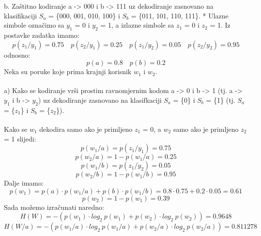 \documentclass[12pt]{article}
\begin{document}
\begin{enumerate}
b. Zaštitno kodiranje a -> 000 i b -> 111 uz dekodiranje zasnovano na klasifikaciji $S_a$ = \{000, 001, 010, 100\} i $S_b$ = \{011, 101, 110, 111\}.
\newpage
* Ulazne simbole označimo sa $y_1$ = 0 i $y_2$ = 1, a izlazne simbole sa $z_1$ = 0 i
$z_2$ = 1. Iz postavke zadatka imamo:
\begin{equation*}
    p(z_1/y_1) = 0.75 \quad p(z_2/y_1) = 0.25 \quad p(z_1/y_2) = 0.05 \quad p(z_2/y_2) = 0.95
\end{equation*}
odnosno:
\begin{equation*}
    p(a) = 0.8 \quad p(b) = 0.2
\end{equation*}
Neka su poruke koje prima krajnji korisnik $w_1$ i $w_2$. \\
\\
a) Kako se kodiranje vrši prostim ravnomjernim kodom a -> 0 i b -> 1 (tj. a -> $y_1$ i b -> $y_2$) uz dekodiranje zasnovano na klasifkaciji $S_a$ = \{0\} i
$S_b$ = \{1\} (tj. $S_a$ = \{$z_1$\} i $S_b$ = \{$z_2$\}).\\
\\
Kako se $w_1$ dekodira samo ako je primljeno $z_1$ = 0, a $w_2$ samo ako je
primljeno $z_2$ = 1 slijedi:
\begin{equation*}
    p(w_1/a) = p(z_1/y_1) = 0.75
\end{equation*}
\begin{equation*}
    p(w_2/a) = 1 - p(w_1/a) = 0.25
\end{equation*}
\begin{equation*}
    p(w_1/b) = p(z_1/y_2) = 0.05
\end{equation*}
\begin{equation*}
    p(w_2/b) = 1 - p(w_1/b) = 0.95
\end{equation*}
Dalje imamo:
\begin{equation*}
    p(w_1) = p(a) \cdot p(w_1/a) + p(b) \cdot p(w_1/b) = 0.8 \cdot 0.75 + 0.2 \cdot  0.05 = 0.61
\end{equation*}
\begin{equation*}
    p(w_2) = 1 - p(w_1) =  0.39
\end{equation*}
Sada možemo izračunati naredno: \\
\begin{equation*}
    H(W) = -(p(w_1) \cdot log_2~p(w_1) + p(w_2) \cdot log_2~p(w_2)) = 0.9648
\end{equation*}
\begin{equation*}
    H(W/a) = -(p(w_1/a) \cdot log_2~p(w_1/a) + p(w_2/a) \cdot log_2~p(w_2/a)) = 0.811278
\end{equation*}

\end{enumerate}
\end{document}
